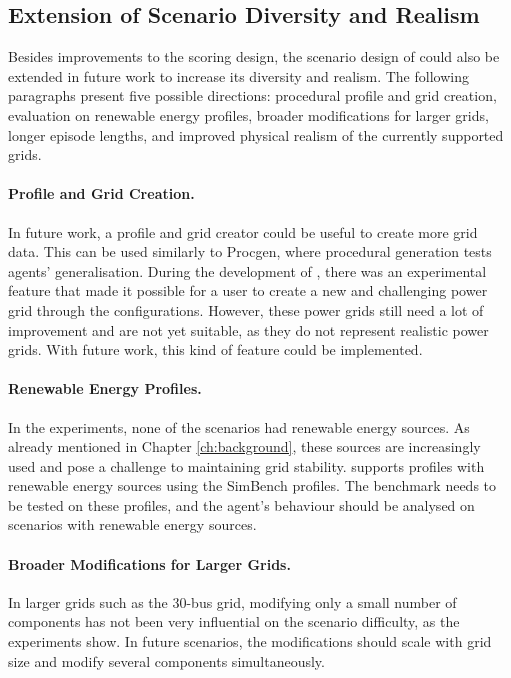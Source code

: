 \subsection{Extension of Scenario Diversity and Realism}\label{ssec:future-scenarios}
Besides improvements to the scoring design, the scenario design of \benchmark could also be extended in future work to increase its diversity and realism. The following paragraphs present five possible directions: procedural profile and grid creation, evaluation on renewable energy profiles, broader modifications for larger grids, longer episode lengths, and improved physical realism of the currently supported grids.

\paragraph{Profile and Grid Creation.}
In future work, a profile and grid creator could be useful to create more grid data. This can be used similarly to Procgen, where procedural generation tests agents' generalisation. During the development of \benchmark, there was an experimental feature that made it possible for a user to create a new and challenging power grid through the configurations. However, these power grids still need a lot of improvement and are not yet suitable, as they do not represent realistic power grids. With future work, this kind of feature could be implemented.

\paragraph{Renewable Energy Profiles.}
In the experiments, none of the scenarios had renewable energy sources. As already mentioned in Chapter \ref{ch:background}, these sources are increasingly used and pose a challenge to maintaining grid stability. \benchmark supports profiles with renewable energy sources using the SimBench profiles. The benchmark needs to be tested on these profiles, and the agent's behaviour should be analysed on scenarios with renewable energy sources.

\paragraph{Broader Modifications for Larger Grids.}
In larger grids such as the 30-bus grid, modifying only a small number of components has not been very influential on the scenario difficulty, as the experiments show. In future scenarios, the modifications should scale with grid size and modify several components simultaneously.

